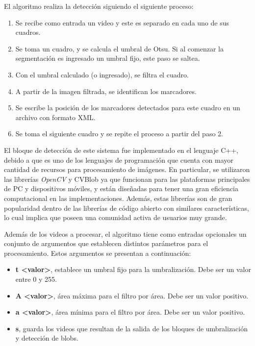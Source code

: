 El algoritmo realiza la detección siguiendo el siguiente proceso:

\begin{enumerate}
  \item Se recibe como entrada un video y este es separado en cada uno de sus cuadros.
  \item Se toma un cuadro, y se calcula el umbral de Otsu. Si al comenzar la segmentación es ingresado un umbral fijo, este paso se saltea.
  \item Con el umbral calculado (o ingresado), se filtra el cuadro.
  \item A partir de la imagen filtrada, se identifican los marcadores.
  \item Se escribe la posición de los marcadores detectados para este cuadro en un archivo con formato XML.
  \item Se toma el siguiente cuadro y se repite el proceso a partir del paso 2.
\end{enumerate}

El bloque de detección de este sistema fue implementado en el lenguaje C++, debido a que es uno de los lenguajes de programación que cuenta con mayor cantidad de recursos para procesamiento de imágenes. En particular, se utilizaron las librerías \emph{OpenCV} \cite{opencv} y CVBlob \cite{cvblob} ya que funcionan para las plataformas principales de PC y dispositivos móviles, y están diseñadas para tener una gran eficiencia computacional en las implementaciones. Además, estas librerías son de gran popularidad dentro de las librerías de código abierto con similares características, lo cual implica que poseen una comunidad activa de usuarios muy grande.

Además de los videos a procesar, el algoritmo tiene como entradas opcionales un conjunto de argumentos que establecen distintos parámetros para el procesamiento. Estos argumentos se presentan a continuación:

 \begin{itemize}
\item \textbf{t <valor>}, establece un umbral fijo para la umbralización. Debe ser un valor entre 0 y 255.
\item \textbf{A <valor>}, área máxima para el filtro por área. Debe ser un valor positivo.
\item \textbf{a <valor>}, área mínima para el filtro por área. Debe ser un valor positivo.
\item \textbf{s}, guarda los videos que resultan de la salida de los bloques de umbralización y detección de blobs.
 \end{itemize}

